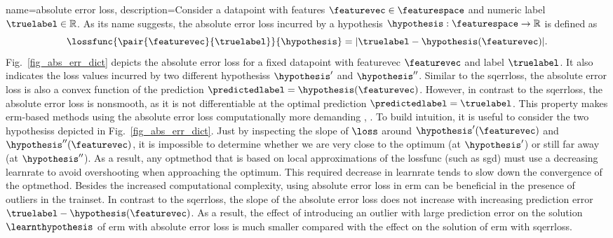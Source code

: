 {name={absolute error loss},
	description={Consider a \gls{datapoint} with \glspl{feature} $\featurevec \in \featurespace$ and numeric 
		\gls{label} $\truelabel \in \mathbb{R}$. As its name suggests, the absolute error \gls{loss} 
		incurred by a \gls{hypothesis} $\hypothesis: \featurespace \rightarrow \mathbb{R}$ 
		is defined as $$\lossfunc{\pair{\featurevec}{\truelabel}}{\hypothesis} = |\truelabel - \hypothesis(\featurevec)|.$$
		Fig.\ \ref{fig_abs_err_dict} depicts the absolute error \gls{loss} for a fixed \gls{datapoint} 
		with \gls{featurevec} $\featurevec$ and \gls{label} $\truelabel$. It also indicates the \gls{loss} values 
		incurred by two different \glspl{hypothesis} $\hypothesis'$ and $\hypothesis''$. Similar to the \gls{sqerrloss}, 
		the absolute error \gls{loss} is also a \gls{convex} \gls{function} of the \gls{prediction} $\predictedlabel=\hypothesis(\featurevec)$. 
		However, in contrast to the \gls{sqerrloss}, the absolute error \gls{loss} is \gls{nonsmooth}, as it is not 
		\gls{differentiable} at the optimal \gls{prediction} $\predictedlabel=\truelabel$. This property 
		makes \gls{erm}-based methods using the absolute error \gls{loss} computationally more demanding \cite{nesterov04}, \cite{OptMLBook}. 
	    	To build intuition, it is useful to consider the two \glspl{hypothesis} depicted in Fig.\ \ref{fig_abs_err_dict}. 
	    	Just by inspecting the slope of $\loss$ around $\hypothesis'(\featurevec)$ and $\hypothesis''(\featurevec)$,
	     	it is impossible to determine whether we are very close to the optimum (at $\hypothesis'$) or still far away (at $\hypothesis''$). 
	     	As a result, any \gls{optmethod} that is based on local approximations of the \gls{lossfunc} (such as \gls{sgd}) 
	     	must use a decreasing \gls{learnrate} to avoid overshooting when approaching the optimum. This required 
	     	decrease in \gls{learnrate} tends to slow down the \gls{convergence} of the 
	     	\gls{optmethod}. Besides the increased computational complexity, using absolute error \gls{loss} in \gls{erm} can 
	     	be beneficial in the presence of \glspl{outlier} in the \gls{trainset}. In contrast to the \gls{sqerrloss}, 
	     	the slope of the absolute error \gls{loss} does not increase with increasing \gls{prediction} error 
	     	$\truelabel - \hypothesis(\featurevec)$. As a result, the effect of introducing an \gls{outlier} with 
	     	large \gls{prediction} error on the solution $\learnthypothesis$ of \gls{erm} with absolute error \gls{loss} 
	     	is much smaller compared with the effect on the solution of \gls{erm} with \gls{sqerrloss}. 
}}
